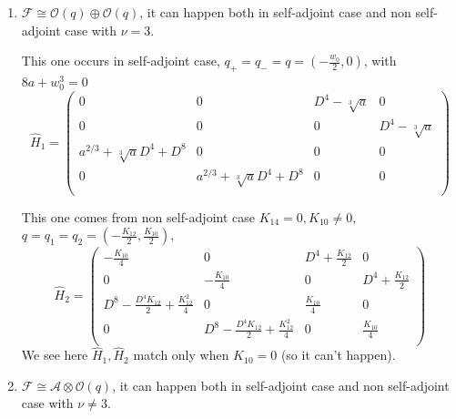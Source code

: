 \documentclass[11pt]{article}
\theoremstyle{definition}
\theoremstyle{plain}
\numberwithin{equation}{section}
\begin{document}
\begin{enumerate}
	The transfer matrix is 
	$$
	T_1=\left(
	\begin{array}{cccc}
		-\frac{\sqrt{-8 a-w_0^3}}{4 \sqrt{2}} & 1 & 0 & 0 \\
		\frac{1}{2} & \frac{2 \sqrt{2}}{\sqrt{-8 a-w_0^3}} & 0 & 0 \\
		0 & 0 & -\frac{\sqrt{-8 a-w_0^3}}{4 \sqrt{2}} & 1 \\
		0 & 0 & \frac{1}{2} & \frac{2 \sqrt{2}}{\sqrt{-8 a-w_0^3}} \\
	\end{array}
	\right)
	$$
	with $T_1^{-1}\hat{H}_2T=\hat{H}_1$.
	
	and 
	$$
	T_2=\left(
	\begin{array}{cccc}
		1 & \frac{2}{\sqrt{-K_{14}}} & 0 & 0 \\
		\frac{1}{4} \left(\sqrt{-K_{14}}+I K_{12}\right) & -\frac{\sqrt{-K_{14}}-I K_{12}}{2 \sqrt{-K_{14}}} & 0 & 0 \\
		0 & 0 & 1 & \frac{2}{\sqrt{-K_{14}}} \\
		0 & 0 & \frac{1}{4} \left(\sqrt{-K_{14}}+I K_{12}\right) & -\frac{\sqrt{-K_{14}}-I K_{12}}{2 \sqrt{-K_{14}}} \\
	\end{array}
	\right)
	$$
	with $T_2^{-1}\hat{H_3}T_2=\hat{H}_4$.
	\item $\mathcal{F}\cong \mathcal{O}(q)\oplus \mathcal{O}(q)$, it can happen both in self-adjoint case and non self-adjoint case with $\nu=3$.
	
	This one occurs in self-adjoint case, $q_+=q_-=q=(-\frac{w_0}{2},0)$, with $8a+w_0^3=0$
	$$
	\hat{H}_1=\left(
	\begin{array}{cccc}
		0 & 0 & D^4-\sqrt[3]{a} & 0 \\
		0 & 0 & 0 & D^4-\sqrt[3]{a} \\
		a^{2/3}+\sqrt[3]{a} D^4+D^8 & 0 & 0 & 0 \\
		0 & a^{2/3}+\sqrt[3]{a} D^4+D^8 & 0 & 0 \\
	\end{array}
	\right)
	$$
	
	This one comes from non self-adjoint case $K_{14}=0, K_{10}\neq 0$, $q=q_1=q_2=(-\frac{K_{12}}{2},\frac{K_{10}}{2})$,
	$$
	\hat{H}_2=\left(
	\begin{array}{cccc}
		-\frac{K_{10}}{4} & 0 & D^4+\frac{K_{12}}{2} & 0 \\
		0 & -\frac{K_{10}}{4} & 0 & D^4+\frac{K_{12}}{2} \\
		D^8-\frac{D^4 K_{12}}{2}+\frac{K_{12}^2}{4} & 0 & \frac{K_{10}}{4} & 0 \\
		0 & D^8-\frac{D^4 K_{12}}{2}+\frac{K_{12}^2}{4} & 0 & \frac{K_{10}}{4} \\
	\end{array}
	\right)
	$$
	We see here $\hat{H}_1,\hat{H}_2$ match only when $K_{10}=0$ (so it can't happen).
	\item $\mathcal{F}\cong\mathcal{A}\otimes \mathcal{O}(q)$, it can happen both in self-adjoint case and non self-adjoint case with $\nu\neq 3$.
	

\end{enumerate}
\end{document}
